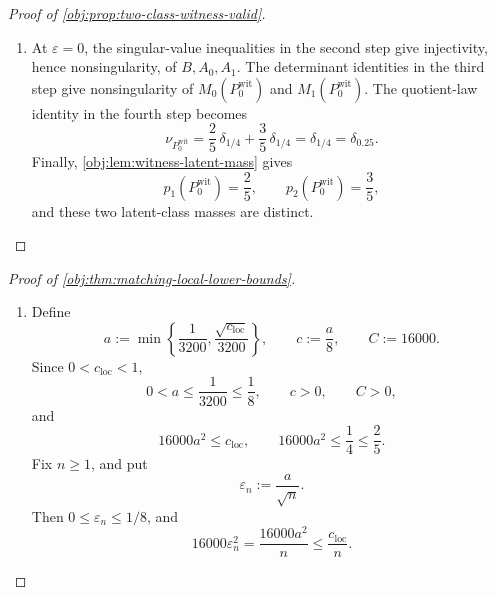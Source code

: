 \documentclass[11pt]{article}
\begin{document}
\begin{proof}[Proof of \cref{obj:prop:two-class-witness-valid}]
\begin{enumerate}
\item At \(\varepsilon=0\), the singular-value inequalities in the second step give injectivity, hence
nonsingularity, of \(B,A_0,A_1\).  The determinant identities in the third step give nonsingularity of
\(M_0(P_0^{\mathrm{wit}})\) and \(M_1(P_0^{\mathrm{wit}})\).  The quotient-law identity in the fourth step becomes
\[
\nu_{P_0^{\mathrm{wit}}}
=
\frac25\,\delta_{1/4}+\frac35\,\delta_{1/4}
=
\delta_{1/4}
=
\delta_{0.25}.
\]
Finally, \cref{obj:lem:witness-latent-mass} gives
\[
p_1(P_0^{\mathrm{wit}})=\frac25,\qquad
p_2(P_0^{\mathrm{wit}})=\frac35,
\]
and these two latent-class masses are distinct. %
\end{enumerate}
\end{proof}

\begin{proof}[Proof of \cref{obj:thm:matching-local-lower-bounds}]
\begin{enumerate}
\item Define
\[
a:=\min\left\{\frac1{3200},\frac{\sqrt{c_{\mathrm{loc}}}}{3200}\right\},
\qquad
c:=\frac a8,
\qquad
C:=16000 .
\]
Since \(0<c_{\mathrm{loc}}<1\),
\[
0<a\le \frac1{3200}\le\frac18,\qquad c>0,\qquad C>0,
\]
and
\[
16000a^2\le c_{\mathrm{loc}},
\qquad
16000a^2\le \frac14\le\frac25 .
\]
Fix \(n\ge1\), and put
\[
\varepsilon_n:=\frac{a}{\sqrt n}.
\]
Then \(0\le\varepsilon_n\le1/8\), and
\[
16000\varepsilon_n^2
=
\frac{16000a^2}{n}
\le
\frac{c_{\mathrm{loc}}}{n}.
\]


\end{enumerate}
\end{proof}
\end{document}
